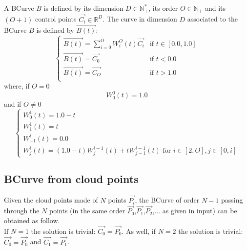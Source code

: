 \documentclass[12pt, a4paper]{article}
\begin{document}
A BCurve $B$ is defined by its dimension $D\in\mathbb{N}^*_+$, its order $O\in\mathbb{N_+}$ and its $(O+1)$ control points $\overrightarrow{C_i}\in\mathbb{R}^D$. The curve in dimension $D$ associated to the BCurve $B$ is defined by $\overrightarrow{B(t)}$:\\
\begin{equation}
\left\lbrace
\begin{array}{ll}
\overrightarrow{B(t)}=\sum_{i=0}^OW^O_i(t)\overrightarrow{C_i}&\textrm{if }t\in[0.0,1.0]\\
\overrightarrow{B(t)}=\overrightarrow{C_0}&\textrm{if }t<0.0\\
\overrightarrow{B(t)}=\overrightarrow{C_{O}}&\textrm{if }t>1.0\\
\end{array}
\right.
\end{equation}
where, if $O=0$\\
\begin{equation}
W^0_0(t)=1.0
\end{equation}
and if $O\neq 0$\\
\begin{equation}
\left\lbrace
\begin{array}{l}
W^1_0(t)=1.0-t\\
W^1_1(t)=t\\
W^i_{-1}(t)=0.0\\
W^i_j(t)=(1.0-t)W^{i-1}_j(t)+tW^{i-1}_{j-1}(t)\textrm{ for }i\in[2,O],j\in[0,i]
\end{array}
\right.
\end{equation}

\subsection{BCurve from cloud points}

Given the cloud points made of $N$ points $\overrightarrow{P_i}$, the BCurve of order $N-1$ passing through the $N$ points (in the same order $\overrightarrow{P_0}$,$\overrightarrow{P_1}$,$\overrightarrow{P_2}$,... as given in input) can be obtained as follow.\\

If $N=1$ the solution is trivial: $\overrightarrow{C_0}=\overrightarrow{P_0}$. As well, if $N=2$ the solution is trivial: $\overrightarrow{C_0}=\overrightarrow{P_0}$ and $\overrightarrow{C_1}=\overrightarrow{P_1}$.\\
\end{document}
